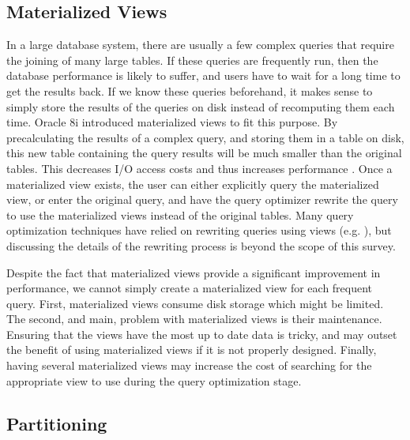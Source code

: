 \documentclass[12pt,a4paper]{article}
\begin{document}
\subsection{Materialized Views}

In a large database system, there are usually a few complex queries that require the joining of many large tables. If these queries are frequently run, then the
database performance is likely to suffer, and users have to wait for a long time to get the results back. If we know these queries beforehand, it makes sense to
simply store the results of the queries on disk instead of recomputing them each time. Oracle 8i introduced materialized views to fit this purpose. By
precalculating the results of a complex query, and storing them in a table on disk, this new table containing the query results will be much
smaller than the original tables. This decreases I/O access costs and thus increases performance \cite{lightstone2007physical, chaudhuri1998overview}. Once a
materialized view exists, the user can either explicitly query the materialized view, or enter the original query, and have the query optimizer rewrite the
query to use the materialized views instead of the original tables. Many query optimization techniques have relied on rewriting queries using views (e.g.
\cite{levy1995answering, gupta1995aggregate, goldstein2001optimizing, abiteboul1998complexity}), but discussing the details of the rewriting process is beyond
the scope of this survey.

Despite the fact that materialized views provide a significant improvement in performance, we cannot simply create a materialized view for each frequent query.
First, materialized views consume disk storage which might be limited. The second, and main, problem with materialized views is their maintenance. Ensuring that
the views have the most up to date data is tricky, and may outset the benefit of using materialized views if it is not properly designed. Finally, having
several materialized views may increase the cost of searching for the appropriate view to use during the query optimization stage.

\subsection{Partitioning}
\end{document}
